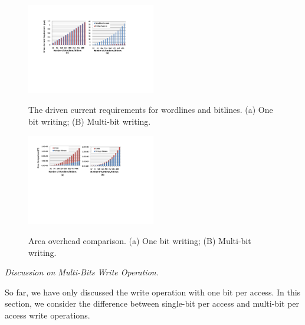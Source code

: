 \begin{figure}%
\centering
  \includegraphics[width=0.5\textwidth]{./figures/drive_i_f.pdf}\\
  \caption{The driven current requirements for wordlines and bitlines. (a) One bit writing; (B) Multi-bit writing.}\label{fig:drive_i}
\end{figure}



\begin{figure}%
\centering
  \includegraphics[width=0.5\textwidth]{./figures/area_comp_f.pdf}\\
  \caption{Area overhead comparison. (a) One bit writing; (B) Multi-bit writing.}\label{fig:area_i}
\vspace{-10pt}
\end{figure}

\vspace{6pt} \emph{Discussion on Multi-Bits Write Operation.} \vspace{6pt}

So far, we have only discussed the write operation with one bit per
access. In this section, we consider the difference between single-bit per
access and multi-bit per access write operations.

